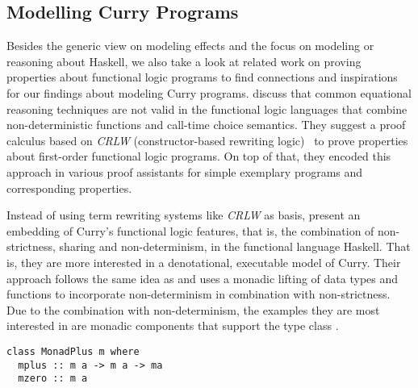 \subsection{Modelling Curry Programs}

Besides the generic view on modeling effects and the focus on modeling
or reasoning about Haskell, we also take a look at related work on
proving properties about functional logic programs to find connections
and inspirations for our findings about modeling Curry programs.
\citet{cleva2004logic} discuss that common equational reasoning
techniques are not valid in the functional logic languages that
combine non-deterministic functions and call-time choice semantics.
They suggest a proof calculus based on \emph{CRLW}
(constructor-based rewriting logic)~\citep{gonzalez1996rewriting} to
prove properties about first-order functional logic programs.
On top of that, they encoded this approach in various proof assistants
for simple exemplary programs and corresponding properties.

Instead of using term rewriting systems like \emph{CRLW} as basis,
\citet{fischer2009purely} present an embedding of Curry's functional
logic features, that is, the combination of non-strictness, sharing
and non-determinism, in the functional language Haskell.
That is, they are more interested in a denotational, executable model
of Curry.
Their approach follows the same idea as \citet{abel2005verifying} and
uses a monadic lifting of data types and functions to incorporate
non-determinism in combination with non-strictness.
Due to the combination with non-determinism, the examples they are
most interested in are monadic components that support the type class
.

\begin{verbatim}
class MonadPlus m where
  mplus :: m a -> m a -> ma
  mzero :: m a
\end{verbatim}

